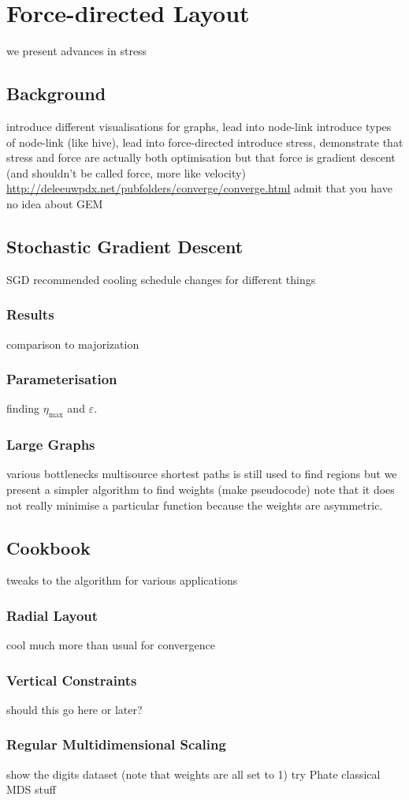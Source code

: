 \chapter{Force-directed Layout}
we present advances in stress

\section{Background}
introduce different visualisations for graphs, lead into node-link
introduce types of node-link (like hive), lead into force-directed
introduce stress, demonstrate that stress and force are actually both optimisation but that force is gradient descent (and shouldn't be called force, more like velocity)
\url{http://deleeuwpdx.net/pubfolders/converge/converge.html}
admit that you have no idea about GEM 

\section{Stochastic Gradient Descent}
SGD
recommended cooling schedule changes for different things
\subsection{Results}
comparison to majorization
\subsection{Parameterisation}
finding $\eta_{\max}$ and $\varepsilon$.
\subsection{Large Graphs}
various bottlenecks
multisource shortest paths is still used to find regions
but we present a simpler algorithm to find weights (make pseudocode)
note that it does not really minimise a particular function because the weights are asymmetric.

\section{Cookbook}
tweaks to the algorithm for various applications
\subsection{Radial Layout}
cool much more than usual for convergence
\subsection{Vertical Constraints}
should this go here or later?
\subsection{Regular Multidimensional Scaling}
show the digits dataset (note that weights are all set to 1)
try Phate classical MDS stuff